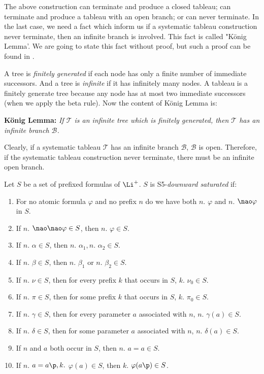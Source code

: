 \qquad The above construction can terminate and produce a closed tableau; can terminate and produce a tableau with an open branch; or can never terminate. In the last case, we need a fact which inform us if a systematic tableau construction never terminate, then an infinite branch is involved. This fact is called "K\"onig Lemma'. We are going to state this fact without proof, but such a proof can be found in \cite{Fitting83}. 

\qquad A tree is \textit{finitely generated} if each node has only a finite number of immediate successors. And a tree is \textit{infinite} if it has infinitely many nodes. A tableau is a finitely generate tree because any node has at most two immediate successors (when we apply the beta rule). Now the content of K\"onig Lemma is: \\

\vspace{10mm}


\textbf{K\"onig Lemma:} \textit{If $\mathcal{T}$ is an infinite tree which is finitely generated, then $\mathcal{T}$ has an infinite branch $\mathcal{B}$.}
\vspace{10mm}


\qquad Clearly, if a systematic tableau $\mathcal{T}$ has an infinite branch $\mathcal{B}$, $\mathcal{B}$ is open. Therefore, if the systematic tableau construction never terminate, there must be an infinite open branch.



\begin{defn}
Let $S$ be a set of prefixed formulas of $\Li^{+}$. $S$ is S5-\textit{downward saturated} if:

\begin{enumerate} [$(i)$]

\item For no atomic formula $\varphi$ and no prefix $n$ do we have both $n.$ $\varphi$ and $n.$ $\nao \varphi$ in $S$. 
\item If $n.$ $\nao\nao\varphi \in S$, then $n.$ $\varphi \in S$.
\item If $n.$ $\alpha \in S$, then $n.$ $\alpha_{1}, n.$ $\alpha_{2} \in S$.
\item If $n.$ $\beta \in S$, then $n.$ $\beta_{1}$ or $n.$ $\beta_{2} \in S$.
\item If $n.$ $\nu \in S$, then for every prefix $k$ that occurs in $S$,  $k.$ $\nu_{0} \in S$.
\item If $n.$ $\pi \in S$, then for some prefix $k$ that occurs in $S$,  $k.$ $\pi_{0} \in S$.
\item If $n.$ $\gamma \in S$, then for every parameter $a$ associated with $n$, $n.$ $\gamma(a) \in S$.
\item If $n.$ $\delta \in S$, then for some parameter $a$ associated with $n$, $n.$ $\delta(a) \in S$.
\item If $n$ and $a$ both occur in $S$, then $n.$ $a=a \in S$.
\item If $n.$ $a=a\p ,k.$ $\varphi(a) \in S$, then $k.$ $\varphi(a\p) \in S$.
\end{enumerate}
\end{defn}


